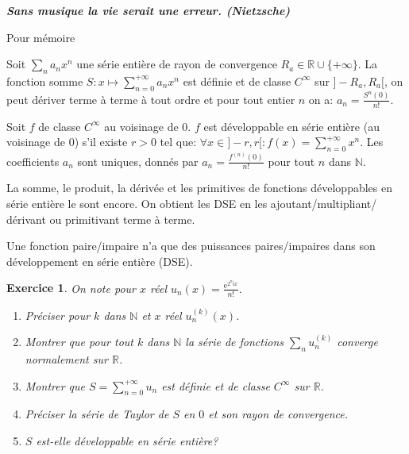 \documentclass[12pt,a4paper]{article}
\newcommand{\R}{\mathbb{R}}
\newcommand{\N}{\mathbb{N}}
\newcommand{\E}{\mathrm{e}}
\newcommand{\I}{\mathrm{i}}
\theoremstyle{break}
\theoremstyle{break}
\newtheorem{Exo}{Exercice}
\begin{document}
\emph{\textbf{
	Sans musique la vie serait une erreur. (Nietzsche)
}}

\begin{bclogo}[couleur = green!30, arrondi = 0.1, logo = \bccoeur, barre = zigzag]{Pour mémoire}

Soit $\sum_n a_n x^n$ une série entière de rayon de convergence $R_a\in\R\cup\{+\infty\}$. La fonction somme $S:x\mapsto \sum_{n=0}^{+\infty}a_n x^n$ est définie et de classe $C^{\infty}$ sur $]-R_a,R_a[$, on peut dériver terme à terme à tout ordre et pour tout entier $n$ on a: $a_n=\frac{S^{n}(0)}{n!}$.

Soit $f$ de classe $C^{\infty}$ au voisinage de $0$. $f$ est développable en série entière (au voisinage de $0$) s'il existe $r>0$ tel que: $\forall x\in]-r,r[:f(x)=\sum_{n=0}^{+\infty}x^n$. Les coefficients $a_n$ sont  uniques, donnés par $a_n=\frac{f^{(n)}(0)}{n!}$ pour tout $n$ dans $\N$.

La somme, le produit, la dérivée et les primitives de fonctions développables en série entière le sont encore. On obtient les DSE en les ajoutant/multipliant/ dérivant ou primitivant terme à terme.


Une fonction paire/impaire n'a que des puissances paires/impaires dans son développement en série entière (DSE). 
\end{bclogo}
\vspace*{1cm}





	
\begin{Exo}
	On note pour $x$ réel  
	$u_n(x)=\frac{\E^{2^n \I x}}{n!}$.
		\begin{enumerate}
			\item
			Préciser pour $k$ dans $\N$ et $x$ réel $u_n^{(k)}(x)$.
			\item
			Montrer que pour tout $k$ dans $\N$ la série de fonctions $\sum_n u_n^{(k)}$ converge normalement sur $\R$.
			\item
			Montrer que $S=\sum_{n=0}^{+\infty}u_n$ est définie et de classe $C^{\infty}$ sur $\R$.
			\item
			Préciser la série de Taylor de $S$ en $0$ et son rayon de convergence.
			\item
			$S$ est-elle développable en série entière?
		\end{enumerate}
\end{Exo}
\end{document}
